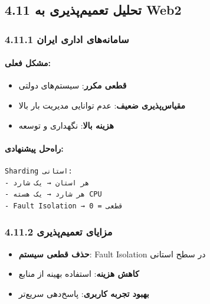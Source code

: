 \documentclass[
]{article}
\providecommand{\tightlist}{%
  \setlength{\itemsep}{0pt}\setlength{\parskip}{0pt}}
\begin{document}
\subsection{4.11 تحلیل تعمیم‌پذیری به
Web2}\label{ux62aux62dux644ux6ccux644-ux62aux639ux645ux6ccux645ux67eux630ux6ccux631ux6cc-ux628ux647-web2}

\subsubsection{4.11.1 سامانه‌های اداری
ایران}\label{ux633ux627ux645ux627ux646ux647ux647ux627ux6cc-ux627ux62fux627ux631ux6cc-ux627ux6ccux631ux627ux646}

\paragraph{مشکل فعلی:}\label{ux645ux634ux6a9ux644-ux641ux639ux644ux6cc}

\begin{itemize}
\tightlist
\item
  \textbf{قطعی مکرر}: سیستم‌های دولتی
\item
  \textbf{مقیاس‌پذیری ضعیف}: عدم توانایی مدیریت بار بالا
\item
  \textbf{هزینه بالا}: نگهداری و توسعه
\end{itemize}

\paragraph{راه‌حل
پیشنهادی:}\label{ux631ux627ux647ux62dux644-ux67eux6ccux634ux646ux647ux627ux62fux6cc}

\begin{verbatim}
Sharding استانی:
- هر استان → یک شارد
- هر شارد → یک هسته CPU
- Fault Isolation → قطعی = 0
\end{verbatim}

\subsubsection{4.11.2 مزایای
تعمیم‌پذیری}\label{ux645ux632ux627ux6ccux627ux6cc-ux62aux639ux645ux6ccux645ux67eux630ux6ccux631ux6cc}

\begin{itemize}
\tightlist
\item
  \textbf{حذف قطعی سیستم}: Fault Isolation در سطح استانی
\item
  \textbf{کاهش هزینه}: استفاده بهینه از منابع
\item
  \textbf{بهبود تجربه کاربری}: پاسخ‌دهی سریع‌تر
\end{itemize}
\end{document}
